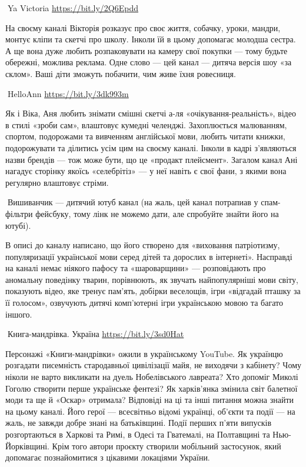 🦉Ya Victoria \url{https://bit.ly/2Q6Epdd}

На своєму каналі Вікторія розказує про своє життя, собачку, уроки, мандри,
монтує кліпи та скетчі про школу. Інколи їй в цьому допомагає молодша сестра. А
ще вона дуже любить розпаковувати на камеру свої покупки — тому будьте
обережні, можлива реклама. Одне слово — цей канал — дитяча версія шоу «за
склом». Ваші діти зможуть побачити, чим живе їхня ровесниця.

🦉HelloAnn \url{https://bit.ly/3dk993m}

Як і Віка, Аня любить знімати смішні скетчі а-ля «очікування-реальність», відео
в стилі «зроби сам», влаштовує кумедні челенджі. Захоплюється малюванням,
спортом, подорожами та вивченням англійської мови, любить читати книжки,
подорожувати та ділитись усім цим на своєму каналі. Інколи в кадрі з’являються
назви брендів — тож може бути, що це «продакт плейсмент». Загалом канал Ані
нагадує сторінку якоїсь «селебрітіз» — у неї навіть є свої фани, з якими вона
регулярно влаштовує стріми.

🦉Вишиванчик — дитячий ютуб канал (на жаль, цей канал потрапиав у спам-фільтри
фейсбуку, тому лінк не можемо дати, але спробуйте знайти його на ютубі).

В описі до каналу написано, що його створено для «виховання патріотизму,
популяризації української мови серед дітей та дорослих в інтернеті». Насправді
на каналі немає ніякого пафосу та «шароварщини» — розповідають про аномальну
поведінку тварин, порівнюють, як звучать найпопулярніші мови світу, показують
відео, яке тренує пам’ять, добірки веселощів, ігри «відгадай пташку за її
голосом», озвучують дитячі комп’ютерні ігри українською мовою та багато іншого.

🦉Книга-мандрівка. Україна \url{https://bit.ly/3sd0Hat}

Персонажі «Книги-мандрівки» ожили в українському YouTube. Як українцю розгадати
писемність стародавньої цивілізації майя, не виходячи з кабінету? Чому ніколи
не варто викликати на дуель Нобелівського лавреата? Хто допоміг Миколі Гоголю
створити перше українське фентезі? Як харків’янка змінила світ балетної моди та
ще й «Оскар» отримала? Відповіді на ці та інші питання можна знайти на цьому
каналі. Його герої — всесвітньо відомі українці, об’єкти та події — на жаль, не
завжди добре знані на батьківщині. Події перших п’яти випусків розгортаються в
Харкові та Римі, в Одесі та Гватемалі, на Полтавщині та Нью-Йорківщині. Крім
того автори проєкту створили мобільний застосунок, який допомагає познайомитися
з цікавими локаціями України.

